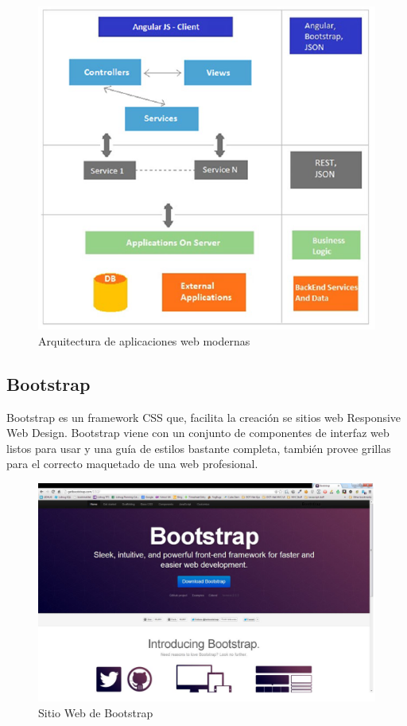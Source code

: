 		\begin{figure}[H]
		    \centering
			\includegraphics[width=16cm]{../imgs/ejemplos/webapp-arq.png}
			\caption{Arquitectura de aplicaciones web modernas}
			\label{figure:webapp-arq}
		\end{figure}
		
		 
	
	\subsection{Bootstrap}
		Bootstrap es un framework CSS que, facilita la creación se sitios web
		Responsive Web Design. Bootstrap viene con un conjunto de componentes de
		interfaz web listos para usar y una guía de estilos bastante completa,
		también provee grillas para el correcto maquetado de una web profesional.
		
		\begin{figure}[H]
		    \centering
			\includegraphics[width=17cm]{../imgs/ejemplos/bootstrap.png}
			\caption{Sitio Web de Bootstrap}
		\end{figure}
		
